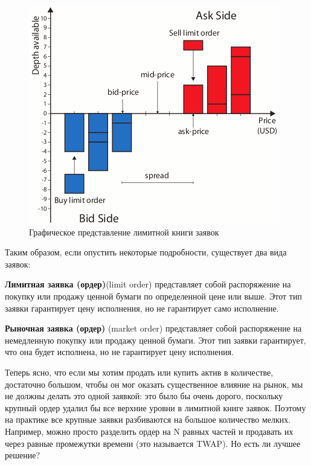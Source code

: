 \begin{figure}
    \includegraphics[scale=0.8]{fig/Graphical-representation-of-the-Limit-Order-Book.png}
    \caption{Графическое представление лимитной книги заявок}
    \label{LOBpic}
\end{figure}



Таким образом, если опустить некоторые подробности, существует два вида заявок:
\begin{definition}
    \textbf{Лимитная заявка (ордер)}(limit order) представляет собой распоряжение на покупку или продажу ценной бумаги по определенной цене или выше. 
    Этот тип заявки гарантирует цену исполнения, но не гарантирует само исполнение.
\end{definition}
\begin{definition}
    \textbf{Рыночная заявка (ордер)} (market order) представляет собой распоряжение на немедленную покупку или продажу ценной бумаги. 
    Этот тип заявки гарантирует, что она будет исполнена, но не гарантирует цену исполнения.
\end{definition}


Теперь ясно, что если мы хотим продать или купить актив в количестве, достаточно большом, чтобы он мог оказать существенное
влияние на рынок, мы не должны делать это одной заявкой: это было бы очень дорого, поскольку крупный ордер
удалил бы все верхние уровни в лимитной книге заявок. Поэтому на практике все крупные заявки разбиваются на большое количество мелких.
Например, можно просто разделить ордер на N равных частей и продавать их через равные промежутки времени (это называется TWAP).
Но есть ли лучшее решение?


